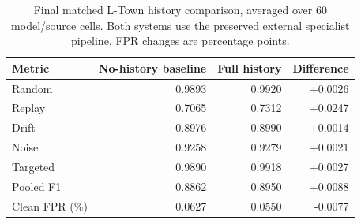 \begin{table}[tbp]
\centering\small
\caption[Final matched L-Town history comparison]{Final matched L-Town history comparison, averaged over 60 model/source cells. Both systems use the preserved external specialist pipeline. FPR changes are percentage points.}
\label{tab:historypaired}
\begin{tabular}{@{}lrrr@{}}
\toprule
Metric & No-history baseline & Full history & Difference\\
\midrule
Random & 0.9893 & 0.9920 & +0.0026\\
Replay & 0.7065 & 0.7312 & +0.0247\\
Drift & 0.8976 & 0.8990 & +0.0014\\
Noise & 0.9258 & 0.9279 & +0.0021\\
Targeted & 0.9890 & 0.9918 & +0.0027\\
Pooled F1 & 0.8862 & 0.8950 & +0.0088\\
Clean FPR (\%) & 0.0627 & 0.0550 & -0.0077\\
\bottomrule
\end{tabular}
\end{table}
